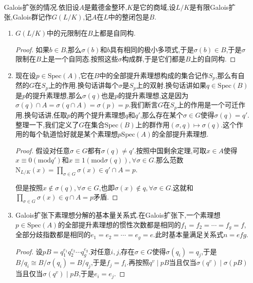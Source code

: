 Galois扩张的情况.依旧设$A$是戴德金整环,$K$是它的商域,设$L/K$是有限Galois扩张,Galois群记作$G(L/K)$,记$A$在$L$中的整闭包是$B$.
\begin{enumerate}
	\item $G(L/K)$中的元限制在$B$上都是自同构.
	\begin{proof}
		
		如果$b\in B$,那么$\sigma(b)$和$b$具有相同的极小多项式,于是$\sigma(b)\in B$,于是$\sigma$限制在$B$上是一个自同态.按照这些$\sigma$构成群,于是它们都是$B$上的自同构.
	\end{proof}
	\item 现在设$p\in\mathrm{Spec}(A)$,它在$B$中的全部提升素理想构成的集合记作$S_p$,那么有自然的$G$在$S_p$上的作用.换句话讲每个$\sigma$是$S_p$上的双射.换句话讲如果$q\in\mathrm{Spec}(B)$是$p$的提升素理想,那么$\sigma(q)$也是$p$的提升素理想,这是因为$\sigma(q)\cap A=\sigma(q\cap A)=\sigma(p)=p$.我们断言$G$在$S_p$上的作用是一个可迁作用.换句话讲,任取$p$的两个提升素理想$q$和$q'$,那么存在某个$\sigma\in G$使得$\sigma(q)=q'$.整理一下,我们定义了$G$在集合$\mathrm{Spec}(B)$上的群作用$(\sigma,q)\mapsto\sigma(q)$.这个作用的每个轨道恰好就是某个素理想$p\mathrm{Spec}(A)$的全部提升素理想.
	\begin{proof}
		
		假设对任意$\sigma\in G$都有$\sigma(q)\not=q'$.按照中国剩余定理,可取$x\in A$使得$x\equiv0(\mathrm{mod}q')$和$x\equiv1(\mathrm{mod}\sigma(q)),\forall\sigma\in G$.那么范数$\mathrm{N}_{L/K}(x)=\prod_{\sigma\in G}\sigma(x)\in q'\cap A=p$.
		
		但是按照$x\not\in\sigma(q),\forall\sigma\in G$,也即$\sigma(x)\not\in q,\forall\sigma\in G$.这就和$\prod_{\sigma\in G}\sigma(x)\in q\cap A=p$矛盾.
	\end{proof}
	\item Galois扩张下素理想分解的基本量关系式.在Galois扩张下,一个素理想$p\in\mathrm{Spec}(A)$的全部提升素理想的惯性次数都是相同的$f_1=f_2=\cdots=f_g=f$,全部分歧指数都是相同的$e_1=e_2=\cdots=e_g=e$.此时基本量满足关系式$n=efg$.
	\begin{proof}
		
		设$pB=q_1^{e_1}q_2^{e_2}\cdots q_g^{e_g}$.对任意$i,j$,存在$\sigma\in G$使得$\sigma(q_i)=q_j$,于是$B/q_i\cong B/\sigma(q_i)=B/q_j$,于是$f_j=f_i$.再按照$q^v\mid pB$当且仅当$\sigma(q^v)\mid\sigma(pB)$当且仅当$\sigma(q^v)\mid pB$,于是$e_i=e_j$.
	\end{proof}
\end{enumerate}

